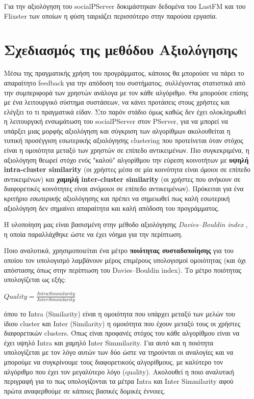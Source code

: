 Για την αξιολόγηση του socialPServer δοκιμάστηκαν δεδομένα του LastFM και του Flixster των οποίων η φύση ταιριάζει περισσότερο στην παρούσα εργασία.

\section{Σχεδιασμός της μεθόδου Αξιολόγησης}
\noindent
Μέσω της πραγματικής χρήση του προγράμματος, κάποιος θα μπορούσε να πάρει το απαραίτητο feedback για την απόδοση του συστήματος,
συλλέγοντας στατιστικά από την συμπεριφορά των χρηστών ανάλογα με τον κάθε αλγόριθμο.
Θα μπορούσε επίσης με ένα λειτουργικό σύστημα συστάσεων, να κάνει 
προτάσεις στους χρήστες και ελέγξει το τι πραγματικά είδαν.
Στο παρόν στάδιο όμως καθώς δεν έχει ολοκληρωθεί η λειτουργική ενσωμάτωση του socialPServer στον PServer, 
για να μπορεί να υπάρξει μιας μορφής αξιολόγηση και σύγκριση των αλγορίθμων 
  ακολουθείται η τυπική προσέγγιση εσωτερικής αξιολόγησης clustering που 
προτείνεται όταν στόχος είναι η ομοιότητα μεταξύ των χρηστών σε επίπεδο αντικειμένων.
Πιο συγκεκριμένα, η αξιολόγηση θεωρεί στόχο ενός "καλού" αλγορίθμου την εύρεση κοινοτήτων με 
\textbf{υψηλή intra-cluster similarity} (οι χρήστες μέσα σε μία κοινότητα είναι \emph{όμοιοι} σε επίπεδο αντικειμένων) και 
\textbf{χαμηλή inter-cluster similarity} (οι χρήστες που ανήκουν σε διαφορετικές κοινότητες είναι \emph{ανόμοιοι} σε επίπεδο αντικειμένων).
Πρόκειται για ένα κριτήριο \emph{εσωτερικής} αξιολόγησης και πρέπει να σημειωθεί πως καλή εσωτερική αξιολόγηση δεν σημαίνει απαραίτητα και καλή απόδοση του προγράμματος.\\
\cite{manning2008introduction}

Η υλοποίηση μας είναι βασισμένη στην μέθοδο αξιολόγησης \emph{Davies–Bouldin index} \cite{DaviesBouldinIndex}, η οποία παραλλάχθηκε ώστε να έχει νόημα
για την περίπτωση. 

Ποιο αναλυτικά, χρησιμοποιείται ένα μέτρο \textbf{ποιότητας συσταδοποίησης} για του οποίου τον υπολογισμό λαμβάνουν μέρος επιμέρους υπολογισμοί ομοιότητας 
(και όχι απόστασης όπως στην περίπτωση του Davies–Bouldin index).
Το μέτρο ποιότητας υπολογίζεται ως εξής:

$ Quality = \frac{Intra Simmilarity}{Inter Simmilarity}  $

όπου το Intra (Similarity) είναι η ομοιότητα που υπάρχει μεταξύ των μελών του ίδιου cluster και Inter (Similarity) η ομοιότητα που έχουν μεταξύ τους οι χρήστες διαφορετικών clusters.
Όπως είναι προφανές στόχος του κάθε αλγορίθμου είναι να έχει υψηλό Intra και χαμηλό Inter Simmilarity. 
Για αυτό και η ποιότητα υπολογίζεται με τον λόγο αυτών των δύο ώστε να τηρούνται οι
αναλογίες και να μπορούμε να συγκρίνουμε τους διαφορετικούς αλγορίθμους, με καλύτερο τον αλγόριθμο που έχει τον μεγαλύτερο λόγο (quality).
Ακολουθεί η ποιο αναλυτική περιγραφή για το πως υπολογίζονται τα μέτρα Intra και Inter Simmilarity αφού πρώτα αναφερθούμε σε κάποιες βασικές δομικές έννοιες.

